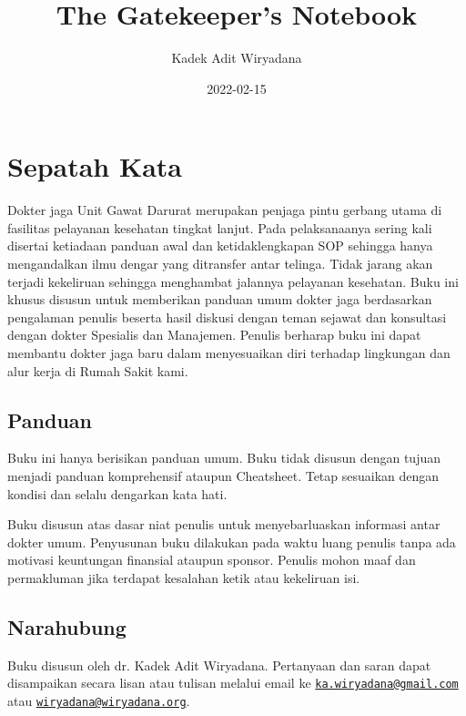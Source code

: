 \documentclass[
]{book}
\title{The Gatekeeper's Notebook}
\author{Kadek Adit Wiryadana}
\date{2022-02-15}
\begin{document}
\maketitle

{
\setcounter{tocdepth}{1}
\tableofcontents
}
\renewcommand\chaptername{BAB}

\addto{\captionsenglish}{\renewcommand*{\contentsname}{Table of contents}}

\hypertarget{sepatah-kata}{%
\chapter{Sepatah Kata}\label{sepatah-kata}}

Dokter jaga Unit Gawat Darurat merupakan penjaga pintu gerbang utama di fasilitas pelayanan kesehatan tingkat lanjut. Pada pelaksanaanya sering kali disertai ketiadaan panduan awal dan ketidaklengkapan SOP sehingga hanya mengandalkan ilmu dengar yang ditransfer antar telinga. Tidak jarang akan terjadi kekeliruan sehingga menghambat jalannya pelayanan kesehatan. Buku ini khusus disusun untuk memberikan panduan umum dokter jaga berdasarkan pengalaman penulis beserta hasil diskusi dengan teman sejawat dan konsultasi dengan dokter Spesialis dan Manajemen. Penulis berharap buku ini dapat membantu dokter jaga baru dalam menyesuaikan diri terhadap lingkungan dan alur kerja di Rumah Sakit kami.

\hypertarget{panduan}{%
\section{Panduan}\label{panduan}}

Buku ini hanya berisikan panduan umum. Buku tidak disusun dengan tujuan menjadi panduan komprehensif ataupun Cheatsheet. Tetap sesuaikan dengan kondisi dan selalu dengarkan kata hati.

Buku disusun atas dasar niat penulis untuk menyebarluaskan informasi antar dokter umum. Penyusunan buku dilakukan pada waktu luang penulis tanpa ada motivasi keuntungan finansial ataupun sponsor. Penulis mohon maaf dan permakluman jika terdapat kesalahan ketik atau kekeliruan isi.

\hypertarget{narahubung}{%
\section{Narahubung}\label{narahubung}}

Buku disusun oleh dr. Kadek Adit Wiryadana. Pertanyaan dan saran dapat disampaikan secara lisan atau tulisan melalui email ke \href{mailto:ka.wiryadana@gmail.com}{\nolinkurl{ka.wiryadana@gmail.com}} atau \href{mailto:wiryadana@wiryadana.org}{\nolinkurl{wiryadana@wiryadana.org}}.
\end{document}
